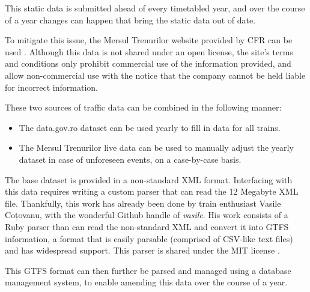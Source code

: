 This static data is submitted ahead of every timetabled year, and over the course of a year changes can happen that bring the static data out of date.

To mitigate this issue, the Mersul Trenurilor website provided by CFR can be used \cite{StiriDeClujLansareCFRIris}. Although this data is not shared under an open license, the site's terms and conditions only prohibit commercial use of the information provided, and allow non-commercial use with the notice that the company cannot be held liable for incorrect information.

These two sources of traffic data can be combined in the following manner:
\begin{itemize}
    \item The data.gov.ro dataset can be used yearly to fill in data for all trains.
    \item The Mersul Trenurilor live data can be used to manually adjust the yearly dataset in case of unforeseen events, on a case-by-case basis.
\end{itemize}

The base dataset is provided in a non-standard XML format. Interfacing with this data requires writing a custom parser that can read the 12 Megabyte XML file. Thankfully, this work has already been done by train enthusiast Vasile Coțovanu, with the wonderful Github handle of \textit{vasile}. His work consists of a Ruby parser than can read the non-standard XML and convert it into GTFS information, a format that is easily parsable (comprised of CSV-like text files) and has widespread support. This parser is shared under the MIT license \cite{VasileRubyExporter}.

This GTFS format can then further be parsed and managed using a database management system, to enable amending this data over the course of a year.